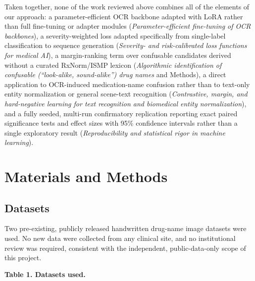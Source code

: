 \documentclass[fleqn,10pt]{wlpeerj}
\begin{document}
Taken together, none of the work reviewed above combines all of the elements of our approach: a parameter-efficient OCR backbone adapted with LoRA rather than full fine-tuning or adapter modules (\textit{Parameter-efficient fine-tuning of OCR backbones}), a severity-weighted loss adapted specifically from single-label classification to sequence generation (\textit{Severity- and risk-calibrated loss functions for medical AI}), a margin-ranking term over confusable candidates derived without a curated RxNorm/ISMP lexicon (\textit{Algorithmic identification of confusable (\textquotedblleft look-alike, sound-alike\textquotedblright) drug names} and Methods), a direct application to OCR-induced medication-name confusion rather than to text-only entity normalization or general scene-text recognition (\textit{Contrastive, margin, and hard-negative learning for text recognition and biomedical entity normalization}), and a fully seeded, multi-run confirmatory replication reporting exact paired significance tests and effect sizes with 95\% confidence intervals rather than a single exploratory result (\textit{Reproducibility and statistical rigor in machine learning}).

\section*{Materials and Methods}\label{sec:methods}

\subsection*{Datasets}\label{sec:datasets}

Two pre-existing, publicly released handwritten drug-name image datasets were used. No new data were collected from any clinical site, and no institutional review was required, consistent with the independent, public-data-only scope of this project.

\textbf{Table 1. Datasets used.}
\end{document}
